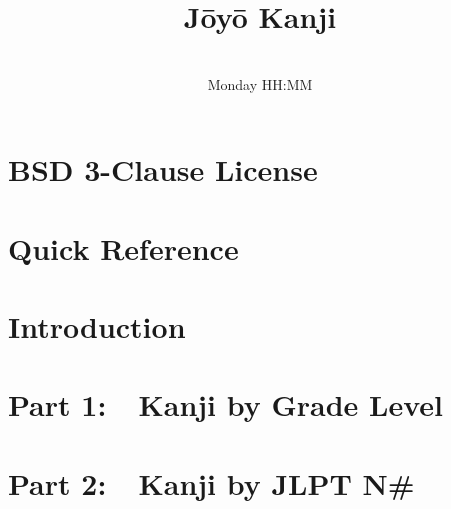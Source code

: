 \documentclass[ letter , 10pt , titlepage ]{article}
\title{J\=oy\=o Kanji }
\author{\BBML }
\date{\DATE \\Monday HH:MM }
\begin{document}
\maketitle


\section*{BSD 3-Clause License }
  \label{S-CR}
\newpage

\tableofcontents
\newpage

\section*{Quick Reference }
  \label{S-QR}

\newpage


\section*{Introduction }
  \label{S-0}

\newpage

\section*{Part 1:\ \ Kanji by Grade Level }
  \label{S-1}

\newpage

\section*{Part 2:\ \ Kanji by JLPT N\# }
  \label{S-2}

\newpage

%  
\end{document}
